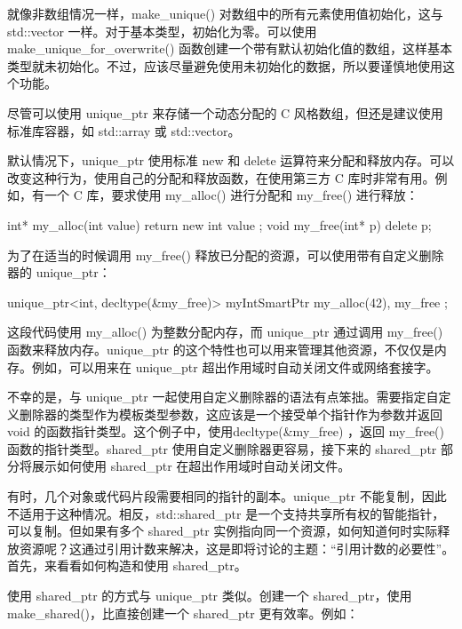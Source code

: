 就像非数组情况一样，make\_unique() 对数组中的所有元素使用值初始化，这与 std::vector 一样。对于基本类型，初始化为零。可以使用 make\_unique\_for\_overwrite() 函数创建一个带有默认初始化值的数组，这样基本类型就未初始化。不过，应该尽量避免使用未初始化的数据，所以要谨慎地使用这个功能。

尽管可以使用 unique\_ptr 来存储一个动态分配的 C 风格数组，但还是建议使用标准库容器，如 std::array 或 std::vector。


默认情况下，unique\_ptr 使用标准 new 和 delete 运算符来分配和释放内存。可以改变这种行为，使用自己的分配和释放函数，在使用第三方 C 库时非常有用。例如，有一个 C 库，要求使用 my\_alloc() 进行分配和 my\_free() 进行释放：

\begin{cpp}
int* my_alloc(int value) { return new int { value }; }
void my_free(int* p) { delete p; }
\end{cpp}

为了在适当的时候调用 my\_free() 释放已分配的资源，可以使用带有自定义删除器的 unique\_ptr：

\begin{cpp}
unique_ptr<int, decltype(&my_free)> myIntSmartPtr { my_alloc(42), my_free };
\end{cpp}

这段代码使用 my\_alloc() 为整数分配内存，而 unique\_ptr 通过调用 my\_free() 函数来释放内存。unique\_ptr 的这个特性也可以用来管理其他资源，不仅仅是内存。例如，可以用来在 unique\_ptr 超出作用域时自动关闭文件或网络套接字。

不幸的是，与 unique\_ptr 一起使用自定义删除器的语法有点笨拙。需要指定自定义删除器的类型作为模板类型参数，这应该是一个接受单个指针作为参数并返回 void 的函数指针类型。这个例子中，使用decltype(\&my\_free) ，返回 my\_free() 函数的指针类型。shared\_ptr 使用自定义删除器更容易，接下来的 shared\_ptr 部分将展示如何使用 shared\_ptr 在超出作用域时自动关闭文件。


有时，几个对象或代码片段需要相同的指针的副本。unique\_ptr 不能复制，因此不适用于这种情况。相反，std::shared\_ptr 是一个支持共享所有权的智能指针，可以复制。但如果有多个 shared\_ptr 实例指向同一个资源，如何知道何时实际释放资源呢？这通过引用计数来解决，这是即将讨论的主题：“引用计数的必要性”。首先，来看看如何构造和使用 shared\_ptr。


使用 shared\_ptr 的方式与 unique\_ptr 类似。创建一个 shared\_ptr，使用 make\_shared()，比直接创建一个 shared\_ptr 更有效率。例如：

